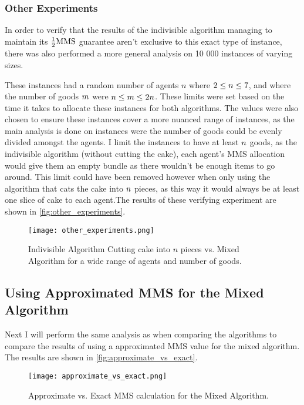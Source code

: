 \subsubsection{Other Experiments}\label{subsec:other-experiments}
In order to verify that the results of the indivisible algorithm managing to maintain its $\frac{1}{2}\text{MMS}$ guarantee aren't exclusive to this exact type of instance, there was also performed a more general analysis on 10 000 instances of varying sizes.

These instances had a random number of agents $n$ where $2\leq n\leq7$, and where the number of goods $m$ were $n\leq m\leq2n$. These limits were set based on the time it takes to allocate these instances for both algorithms. The values were also chosen to ensure these instances cover a more nuanced range of instances, as the main analysis is done on instances were the number of goods could be evenly divided amongst the agents. I limit the instances to have at least $n$ goods, as the indivisible algorithm (without cutting the cake), each agent's MMS allocation would give them an empty bundle as there wouldn't be enough items to go around. This limit could have been removed however when only using the algorithm that cats the cake into $n$ pieces, as this way it would always be at least one slice of cake to each agent.The results of these verifying experiment are shown in \autoref{fig:other_experiments}.

\begin{figure}
    \centering
    \texttt{[image: other\_experiments.png]}
    \caption{Indivisible Algorithm Cutting cake into $n$ pieces vs. Mixed Algorithm for a wide range of agents and number of goods.}
    \label{fig:other_experiments}
\end{figure}






\subsection{Using Approximated MMS for the Mixed Algorithm}
Next I will perform the same analysis as when comparing the algorithms to compare the results of using a approximated MMS value for the mixed algorithm. The results are shown in \autoref{fig:approximate_vs_exact}.


\begin{figure}
    \centering
    \texttt{[image: approximate\_vs\_exact.png]}
    \caption{Approximate vs. Exact MMS calculation for the Mixed Algorithm.}
    \label{fig:approximate_vs_exact}
\end{figure}

